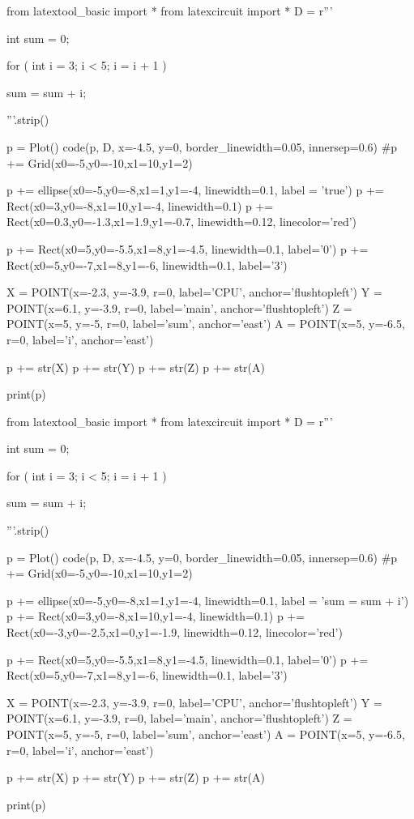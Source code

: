 \begin{python}
from latextool_basic import *
from latexcircuit import *
D = r'''



int sum = 0;

    for ( int i = 3;     i < 5;     i = i + 1 )


        sum = sum + i;



'''.strip()

p = Plot()
code(p, D, x=-4.5, y=0, border_linewidth=0.05, innersep=0.6)
#p += Grid(x0=-5,y0=-10,x1=10,y1=2)

p += ellipse(x0=-5,y0=-8,x1=1,y1=-4, linewidth=0.1, label = 'true')
p += Rect(x0=3,y0=-8,x1=10,y1=-4, linewidth=0.1)
p += Rect(x0=0.3,y0=-1.3,x1=1.9,y1=-0.7, linewidth=0.12, linecolor='red')

p += Rect(x0=5,y0=-5.5,x1=8,y1=-4.5, linewidth=0.1, label='0')
p += Rect(x0=5,y0=-7,x1=8,y1=-6, linewidth=0.1, label='3')

X = POINT(x=-2.3, y=-3.9, r=0, label='CPU', anchor='flushtopleft')
Y = POINT(x=6.1, y=-3.9, r=0, label='main', anchor='flushtopleft')
Z = POINT(x=5, y=-5, r=0, label='sum', anchor='east')
A = POINT(x=5, y=-6.5, r=0, label='i', anchor='east')

p += str(X)
p += str(Y)
p += str(Z)
p += str(A)

print(p)
\end{python}

\begin{python}
from latextool_basic import *
from latexcircuit import *
D = r'''



int sum = 0;

    for ( int i = 3;     i < 5;     i = i + 1 )


        sum = sum + i;



'''.strip()

p = Plot()
code(p, D, x=-4.5, y=0, border_linewidth=0.05, innersep=0.6)
#p += Grid(x0=-5,y0=-10,x1=10,y1=2)

p += ellipse(x0=-5,y0=-8,x1=1,y1=-4, linewidth=0.1, label = 'sum = sum + i')
p += Rect(x0=3,y0=-8,x1=10,y1=-4, linewidth=0.1)
p += Rect(x0=-3,y0=-2.5,x1=0,y1=-1.9, linewidth=0.12, linecolor='red')

p += Rect(x0=5,y0=-5.5,x1=8,y1=-4.5, linewidth=0.1, label='0')
p += Rect(x0=5,y0=-7,x1=8,y1=-6, linewidth=0.1, label='3')

X = POINT(x=-2.3, y=-3.9, r=0, label='CPU', anchor='flushtopleft')
Y = POINT(x=6.1, y=-3.9, r=0, label='main', anchor='flushtopleft')
Z = POINT(x=5, y=-5, r=0, label='sum', anchor='east')
A = POINT(x=5, y=-6.5, r=0, label='i', anchor='east')

p += str(X)
p += str(Y)
p += str(Z)
p += str(A)

print(p)
\end{python}

